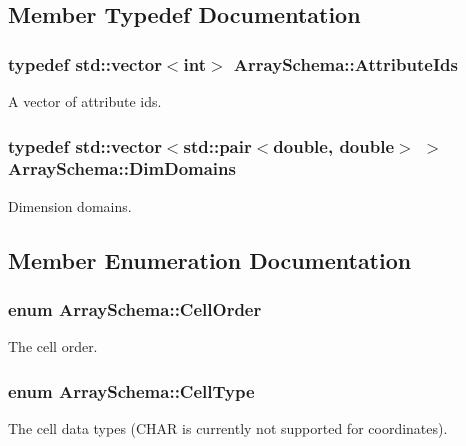 \subsection{Member Typedef Documentation}
\hypertarget{classArraySchema_a55137cd3ae03a3978fd17f36025ca2a8}{}
\subsubsection[{Attribute\+Ids}]{\setlength{\rightskip}{0pt plus 5cm}typedef std\+::vector$<$int$>$ {\bf Array\+Schema\+::\+Attribute\+Ids}}\label{classArraySchema_a55137cd3ae03a3978fd17f36025ca2a8}
A vector of attribute ids. \hypertarget{classArraySchema_aa0dcbbfd193648a9500d54e104115de8}{}
\subsubsection[{Dim\+Domains}]{\setlength{\rightskip}{0pt plus 5cm}typedef std\+::vector$<$std\+::pair$<$double, double$>$ $>$ {\bf Array\+Schema\+::\+Dim\+Domains}}\label{classArraySchema_aa0dcbbfd193648a9500d54e104115de8}
Dimension domains. 

\subsection{Member Enumeration Documentation}
\hypertarget{classArraySchema_a847601130253f905337b5e284e1b78f2}{}
\subsubsection[{Cell\+Order}]{\setlength{\rightskip}{0pt plus 5cm}enum {\bf Array\+Schema\+::\+Cell\+Order}}\label{classArraySchema_a847601130253f905337b5e284e1b78f2}
The cell order. \hypertarget{classArraySchema_af0490cb0a1e903b6fc768daa91cb5eed}{}
\subsubsection[{Cell\+Type}]{\setlength{\rightskip}{0pt plus 5cm}enum {\bf Array\+Schema\+::\+Cell\+Type}}\label{classArraySchema_af0490cb0a1e903b6fc768daa91cb5eed}
The cell data types (C\+H\+A\+R is currently not supported for coordinates). \hypertarget{classArraySchema_a167615fb84dd6124ab2dac0dbbf35d46}{}
